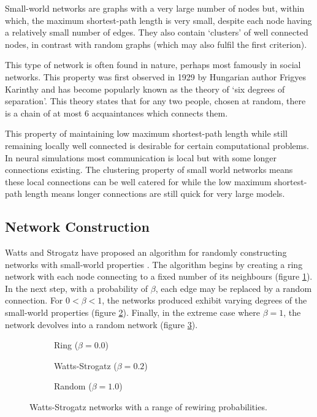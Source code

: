 		Small-world networks are graphs with a very large number of nodes but,
		within which, the maximum shortest-path length is very small, despite each
		node having a relatively small number of edges. They also contain `clusters'
		of well connected nodes, in contrast with random graphs (which may also
		fulfil the first criterion).
		
		This type of network is often found in nature, perhaps most famously in
		social networks. This property was first observed in 1929 by Hungarian
		author Frigyes Karinthy\cite{karinthy29} and has become popularly known as
		the theory of `six degrees of separation'. This theory states that for any
		two people, chosen at random, there is a chain of at most 6 acquaintances
		which connects them.
		
		This property of maintaining low maximum shortest-path length while still
		remaining locally well connected is desirable for certain computational
		problems. In neural simulations most communication is local but with some
		longer connections existing. The clustering property of small world networks
		means these local connections can be well catered for while the low maximum
		shortest-path length means longer connections are still quick for very large
		models.
		
		\subsection{Network Construction}
		
			Watts and Strogatz have proposed an algorithm for randomly constructing
			networks with small-world properties \cite{watts98}. The algorithm begins
			by creating a ring network with each node connecting to a fixed number of
			its neighbours (figure \ref{fig:ringNetworkB0}). In the next step, with a
			probability of $\beta$, each edge may be replaced by a random connection.
			For $0 < \beta < 1$, the networks produced exhibit varying degrees of the
			small-world properties (figure \ref{fig:ringNetworkB02}).  Finally, in the
			extreme case where $\beta=1$, the network devolves into a random network
			(figure \ref{fig:ringNetworkB1}).
			
			\begin{figure}
				\center
				\begin{subfigure}[t]{0.3\textwidth}
					\center
					
					\caption{Ring ($\beta = 0.0$)}
					\label{fig:ringNetworkB0}
				\end{subfigure}
				\begin{subfigure}[t]{0.3\textwidth}
					\center
					
					\caption{Watts-Strogatz ($\beta = 0.2$)}
					\label{fig:ringNetworkB02}
				\end{subfigure}
				\begin{subfigure}[t]{0.3\textwidth}
					\center
					
					\caption{Random ($\beta = 1.0$)}
					\label{fig:ringNetworkB1}
				\end{subfigure}
				
				\caption{Watts-Strogatz networks with a range of rewiring
				probabilities.}
				\label{fig:ringNetwork}
			\end{figure}
			
